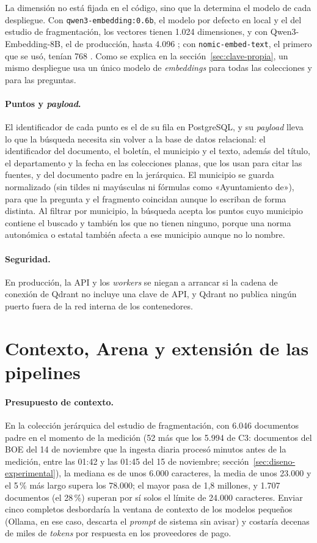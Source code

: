 La dimensión no está fijada en el código, sino que la determina el modelo de cada despliegue. Con \texttt{qwen3-embedding:0.6b}, el modelo por defecto en local y el del estudio de fragmentación, los vectores tienen 1.024 dimensiones, y con Qwen3-Embedding-8B, el de producción, hasta 4.096 \cite{zhang2025qwen3emb}; con \texttt{nomic-embed-text}, el primero que se usó, tenían 768 \cite{nussbaum2024}.
Como se explica en la sección~\ref{sec:clave-propia}, un mismo despliegue usa un único modelo de \emph{embeddings} para todas las colecciones y para las preguntas.

\paragraph{Puntos y \emph{payload}.} El identificador de cada punto es el de su fila en PostgreSQL, y su \emph{payload} lleva lo que la búsqueda necesita sin volver a la base de datos relacional: el identificador del documento, el boletín, el municipio y el texto, además del título, el departamento y la fecha en las colecciones planas, que los usan para citar las fuentes, y del documento padre en la jerárquica. El municipio se guarda normalizado (sin tildes ni mayúsculas ni fórmulas como «Ayuntamiento de»), para que la pregunta y el fragmento coincidan aunque lo escriban de forma distinta. Al filtrar por municipio, la búsqueda acepta los puntos cuyo municipio contiene el buscado y también los que no tienen ninguno, porque una norma autonómica o estatal también afecta a ese municipio aunque no lo nombre.

\paragraph{Seguridad.} En producción, la API y los \emph{workers} se niegan a arrancar si la cadena de conexión de Qdrant no incluye una clave de API, y Qdrant no publica ningún puerto fuera de la red interna de los contenedores.

\section{Contexto, Arena y extensión de las pipelines}
\label{sec:arena-diseno}

\paragraph{Presupuesto de contexto.} En la colección jerárquica del estudio de fragmentación, con 6.046 documentos padre en el momento de la medición (52 más que los 5.994 de C3: documentos del BOE del 14 de noviembre que la ingesta diaria procesó minutos antes de la medición, entre las 01:42 y las 01:45 del 15 de noviembre; sección~\ref{sec:diseno-experimental}), la mediana es de unos 6.000 caracteres, la media de unos 23.000 y el 5\,\% más largo supera los 78.000; el mayor pasa de 1,8 millones, y 1.707 documentos (el 28\,\%) superan por sí solos el límite de 24.000 caracteres. Enviar cinco completos desbordaría la ventana de contexto de los modelos pequeños (Ollama, en ese caso, descarta el \emph{prompt} de sistema sin avisar) y costaría decenas de miles de \emph{tokens} por respuesta en los proveedores de pago.

